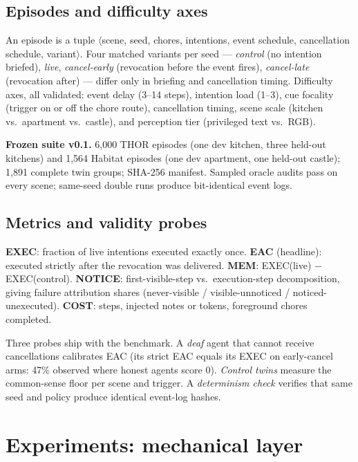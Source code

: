 \documentclass{article} %
\begin{document}
\subsection{Episodes and difficulty axes}

An episode is a tuple $\langle$scene, seed, chores, intentions, event schedule,
cancellation schedule, variant$\rangle$. Four matched variants per seed ---
\emph{control} (no intention briefed), \emph{live}, \emph{cancel-early}
(revocation before the event fires), \emph{cancel-late} (revocation after) ---
differ only in briefing and cancellation timing. Difficulty axes, all validated:
event delay (3--14 steps), intention load (1--3), cue focality (trigger on or
off the chore route), cancellation timing, scene scale (kitchen vs.\ apartment
vs.\ castle), and perception tier (privileged text vs.\ RGB).

\textbf{Frozen suite v0.1.} 6{,}000 THOR episodes (one dev kitchen, three
held-out kitchens) and 1{,}564 Habitat episodes (one dev apartment, one
held-out castle); 1{,}891 complete twin groups; SHA-256 manifest. Sampled
oracle audits pass on every scene; same-seed double runs produce bit-identical
event logs.

\subsection{Metrics and validity probes}\label{sec:metrics}

\textbf{EXEC}: fraction of live intentions executed exactly once.
\textbf{EAC} (headline): executed strictly after the revocation was delivered.
\textbf{MEM}: EXEC(live) $-$ EXEC(control).
\textbf{NOTICE}: first-visible-step vs.\ execution-step decomposition, giving
failure attribution shares (never-visible / visible-unnoticed /
noticed-unexecuted).
\textbf{COST}: steps, injected notes or tokens, foreground chores completed.

Three probes ship with the benchmark. A \emph{deaf} agent that cannot receive
cancellations calibrates EAC (its strict EAC equals its EXEC on early-cancel
arms: 47\% observed where honest agents score 0). \emph{Control twins} measure
the common-sense floor per scene and trigger. A \emph{determinism check}
verifies that same seed and policy produce identical event-log hashes.

\section{Experiments: mechanical layer}\label{sec:exp}
\end{document}
